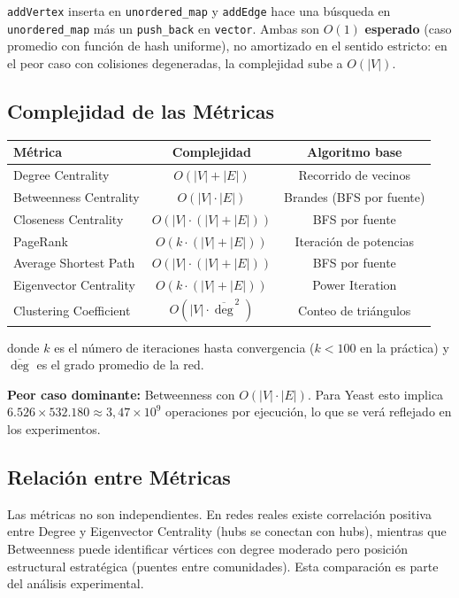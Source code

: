 \texttt{addVertex} inserta en \texttt{unordered\_map} y \texttt{addEdge} hace una búsqueda
en \texttt{unordered\_map} más un \texttt{push\_back} en \texttt{vector}. Ambas son $O(1)$
\textbf{esperado} (caso promedio con función de hash uniforme), no amortizado en el sentido
estricto: en el peor caso con colisiones degeneradas, la complejidad sube a $O(|V|)$.

\subsection{Complejidad de las Métricas}

\begin{center}
\begin{tabular}{lcc}
\toprule
\textbf{Métrica} & \textbf{Complejidad} & \textbf{Algoritmo base} \\
\midrule
Degree Centrality & $O(|V|+|E|)$ & Recorrido de vecinos \\
Betweenness Centrality & $O(|V| \cdot |E|)$ & Brandes (BFS por fuente) \\
Closeness Centrality & $O(|V| \cdot (|V|+|E|))$ & BFS por fuente \\
PageRank & $O(k \cdot (|V|+|E|))$ & Iteración de potencias \\
Average Shortest Path & $O(|V| \cdot (|V|+|E|))$ & BFS por fuente \\
Eigenvector Centrality & $O(k \cdot (|V|+|E|))$ & Power Iteration \\
Clustering Coefficient & $O(|V| \cdot \overline{\deg}^{\,2})$ & Conteo de triángulos \\
\bottomrule
\end{tabular}
\end{center}

donde $k$ es el número de iteraciones hasta convergencia ($k < 100$ en la práctica)
y $\overline{\deg}$ es el grado promedio de la red.

\textbf{Peor caso dominante:} Betweenness con $O(|V| \cdot |E|)$. Para Yeast esto
implica $6.526 \times 532.180 \approx 3{,}47 \times 10^9$ operaciones por ejecución,
lo que se verá reflejado en los experimentos.

\subsection{Relación entre Métricas}

Las métricas no son independientes. En redes reales existe correlación positiva entre
Degree y Eigenvector Centrality (hubs se conectan con hubs), mientras que Betweenness
puede identificar vértices con degree moderado pero posición estructural estratégica
(puentes entre comunidades). Esta comparación es parte del análisis experimental.
